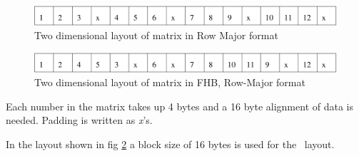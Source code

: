 \begin{figure}
\begin{center}
\includegraphics[width=120mm]{./images/2d_layout_row_mayor.pdf}
\end{center}
\caption{Two dimensional layout of matrix in Row Major format}
\label{fig:2d_layout_row_mayor}
\end{figure}

\begin{figure}
\begin{center}
\includegraphics[width=120mm]{./images/2d_layout_fhb.pdf}
\end{center}
\caption{Two dimensional layout of matrix in FHB, Row-Major format}
\label{fig:2d_layout_fhb}
\end{figure}

Each number in the matrix takes up 4 bytes and a 16 byte alignment of
data is needed. Padding is written as \emph{x}'s.





In the layout shown in fig \ref{fig:2d_layout_fhb} a block size of 16
bytes is used for the \FHB\ layout.

